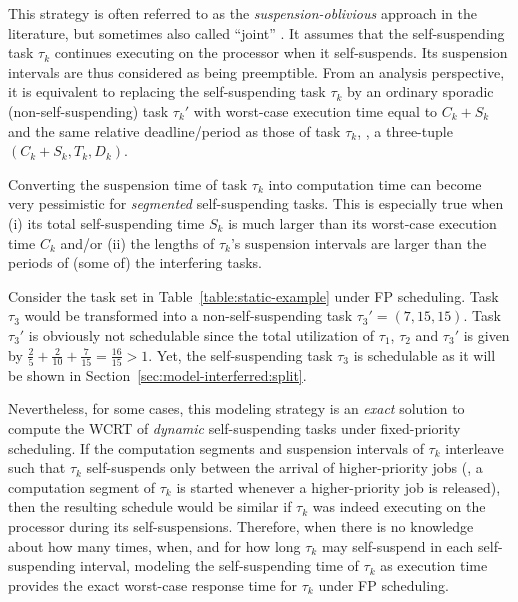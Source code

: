 \label{sec:model-interferred-oblivious}

This strategy is often referred to as the \emph{suspension-oblivious} approach in the literature, but sometimes also called ``joint'' \cite{bletsas:thesis}. It assumes that the self-suspending task $\tau_k$ continues executing on the processor when it self-suspends. Its suspension intervals are thus considered as being preemptible. From an analysis perspective, it is equivalent to replacing the self-suspending task $\tau_k$ by an ordinary sporadic (non-self-suspending) task $\tau_k'$ with worst-case execution time equal to $C_k + S_k$ and the same relative deadline/period as those of task $\tau_k$, \ie, a three-tuple $(C_k+S_k, T_k, D_k)$. 

Converting the suspension time of task $\tau_k$ into computation time can become very pessimistic for \emph{segmented} self-suspending tasks. This is especially true when (i) its total self-suspending time $S_k$ is much larger than its worst-case execution time $C_k$ and/or (ii) the lengths of $\tau_k$'s suspension intervals are larger than the periods of (some of) the interfering tasks. 

\begin{example}
\label{ex:suspension-as-comput}   
Consider the task set in Table~\ref{table:static-example} under FP scheduling. Task $\tau_3$ would be transformed into a non-self-suspending task $\tau_3'=(7,15,15)$. Task $\tau_3'$ is obviously not schedulable since the total utilization of $\tau_1$, $\tau_2$ and $\tau_3'$ is given by $\frac{2}{5} + \frac{2}{10} + \frac{7}{15} = \frac{16}{15} > 1$. Yet, the self-suspending task $\tau_3$ is schedulable as it will be shown in Section~\ref{sec:model-interferred:split}.
\hfill\myendproof  
\end{example}

Nevertheless, for some cases, this modeling strategy is an \emph{exact} solution to compute the WCRT of \emph{dynamic} self-suspending tasks under fixed-priority scheduling. If the computation segments and suspension intervals of $\tau_k$ interleave such that $\tau_k$ self-suspends only between the arrival of higher-priority jobs
(\ie,  a computation segment of $\tau_k$ is started whenever a higher-priority job is released), then the resulting schedule would be similar if $\tau_k$ was indeed executing on the processor during its self-suspensions. Therefore, when there is no knowledge about how many times, when, and for how long $\tau_k$ may self-suspend in each 
self-suspending interval, modeling the self-suspending time of $\tau_k$ as execution time provides the exact worst-case response 
time for $\tau_k$ under FP scheduling. 

